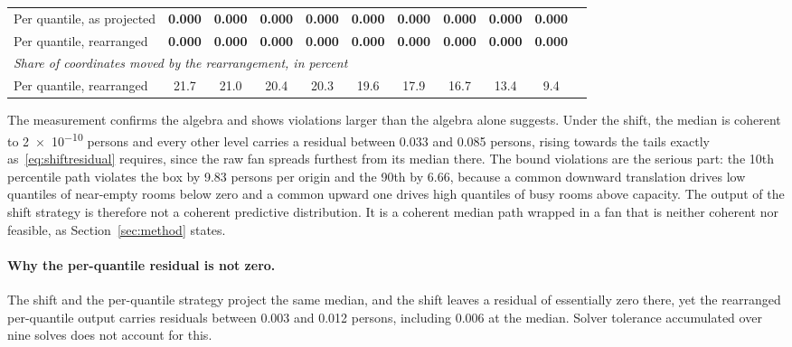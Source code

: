 \documentclass[utf8]{FrontiersinHarvard}
\newif\ifrevisionmarkup
\newcommand{\new}[1]{\ifrevisionmarkup\textcolor{revision}{#1}\else#1\fi}
\newif\ifsecondrevisionmarkup
\newcommand{\rev}[1]{\ifsecondrevisionmarkup\textcolor{revisiontwo}{#1}\else#1\fi}
\theoremstyle{plain}
\theoremstyle{definition}
\theoremstyle{remark}
\newcommand{\best}[1]{\textbf{#1}}
\begin{document}
{\begin{table}[htbp]
\begin{tabular}{lcccccccccc}
\rev{Per quantile, as projected} & \best{0.000} & \best{0.000} & \best{0.000} & \best{0.000} & \best{0.000} & \best{0.000} & \best{0.000} & \best{0.000} & \best{0.000} \\
\rev{Per quantile, rearranged} & \rev{\best{0.000}} & \rev{\best{0.000}} & \rev{\best{0.000}} & \rev{\best{0.000}} & \rev{\best{0.000}} & \rev{\best{0.000}} & \rev{\best{0.000}} & \rev{\best{0.000}} & \rev{\best{0.000}} \\
\midrule
\multicolumn{10}{l}{\rev{\emph{Share of coordinates moved by the rearrangement, in percent}}}\\
\rev{Per quantile, rearranged} & \rev{21.7} & \rev{21.0} & \rev{20.4} & \rev{20.3} & \rev{19.6} & \rev{17.9} & \rev{16.7} & \rev{13.4} & \rev{9.4} \\
\bottomrule
\end{tabular}
\end{table}}

\new{The measurement confirms the algebra \rev{and shows violations larger than the algebra alone suggests}. Under the shift, the median is coherent to \num{2e-10} persons and every other level carries a residual between \num{0.033} and \num{0.085} persons, rising towards the tails exactly as~\eqref{eq:shiftresidual} requires, since the raw fan spreads furthest from its median there. The bound violations are the serious part: the \num{10}th percentile path violates the box by \num{9.83} persons per origin and the \num{90}th by \num{6.66}, because a common downward translation drives low quantiles of near-empty rooms below zero and a common upward one drives high quantiles of busy rooms above capacity. \rev{The output of the shift strategy is therefore not a coherent predictive distribution.} It is a coherent median path wrapped in a fan that is neither coherent nor feasible\rev{, as Section~\ref{sec:method} states}.}

\rev{\paragraph{Why the per-quantile residual is not zero.} The shift and the per-quantile strategy project the same median, and the shift leaves a residual of essentially zero there, yet the rearranged per-quantile output carries residuals between \num{0.003} and \num{0.012} persons, including \num{0.006} at the median. Solver tolerance accumulated over nine solves does not account for this.}
\end{document}
